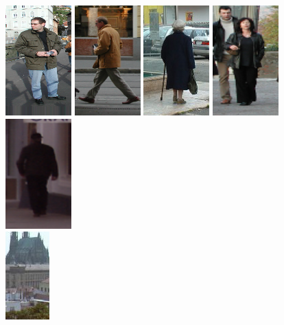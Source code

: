 \begin{figure}[hp]
  \centering
  \includegraphics[scale=.6]{images/train1}
  \includegraphics[scale=.6]{images/train2}
  \includegraphics[scale=.6]{images/train3}
  \includegraphics[scale=.6]{images/train4}
  \includegraphics[scale=.6]{images/train5}\\
  \includegraphics[scale=.9]{images/neg1}

\end{figure}
